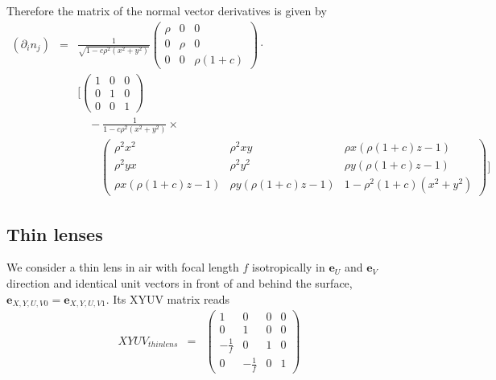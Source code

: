 \documentclass[12pt,a4paper,twoside,openright,BCOR10mm,headsepline,titlepage,abstracton,chapterprefix,final]{scrreprt}
\newcommand\Vector[1]{{\mathbf{#1}}}
\begin{document}
Therefore the matrix of the normal vector derivatives is given by
\begin{eqnarray}
 (\partial_i n_j) &=& \frac{1}{\sqrt{ 1 - c \rho^2 (x^2 + y^2)}}
\begin{pmatrix}
  \rho & 0 & 0 \\
  0 & \rho & 0 \\
  0 & 0 & \rho(1+c)
\end{pmatrix}\cdot\nonumber\\
&&
\biggl[
\begin{pmatrix}
 1 & 0 & 0 \\
 0 & 1 & 0 \\
 0 & 0 & 1
\end{pmatrix}\nonumber\\
&&\quad
- \frac{1}{1 - c \rho^2 (x^2 + y^2)}\times\nonumber\\
&&\quad\quad
\begin{pmatrix}
 \rho^2 x^2 & \rho^2 x y & \rho x (\rho (1+c) z - 1) \\
 \rho^2 y x & \rho^2 y^2 & \rho y (\rho (1+c) z - 1) \\
 \rho x (\rho (1+c) z - 1) & \rho y (\rho (1+c) z - 1) & 1-\rho^2 (1+c) (x^2+y^2)%
\end{pmatrix}
\biggr]
\end{eqnarray}






\subsection{Thin lenses}
We consider a thin lens in air with focal length $f$ isotropically in $\Vector{e}_U$ and $\Vector{e}_V$ direction
and identical unit vectors in front of and behind the surface, $\Vector{e}_{X,Y,U,V 0} = \Vector{e}_{X,Y,U,V 1}$.
Its XYUV matrix reads
\begin{eqnarray}
XYUV_{thin lens} &=&
 \begin{pmatrix}
  1 & 0 & 0 & 0 \\
  0 & 1 & 0 & 0 \\
  -\frac{1}{f} & 0 & 1 & 0 \\
  0 & -\frac{1}{f} & 0 & 1
 \end{pmatrix}
\end{eqnarray}
\end{document}
